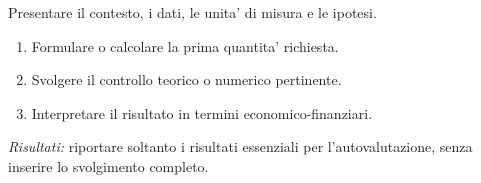 \begin{exercise}
\label{ex:capNN-identificativo-proposto}
Presentare il contesto, i dati, le unita' di misura e le ipotesi.

\begin{enumerate}
\item Formulare o calcolare la prima quantita' richiesta.
\item Svolgere il controllo teorico o numerico pertinente.
\item Interpretare il risultato in termini economico-finanziari.
\end{enumerate}

\smallskip
\textit{Risultati:} riportare soltanto i risultati essenziali per
l'autovalutazione, senza inserire lo svolgimento completo.
\end{exercise}

